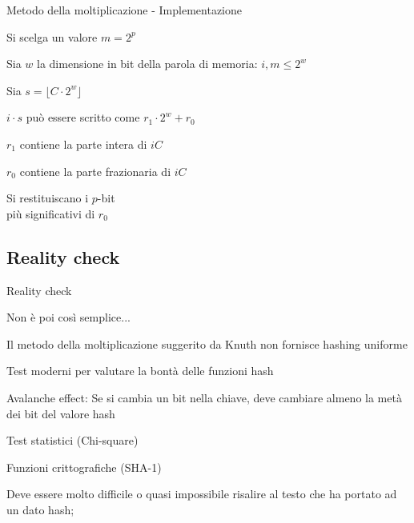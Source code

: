 \begin{frame}{Metodo della moltiplicazione - Implementazione}


\vspace{-9pt}
\BIL
\item Si scelga un valore $m=2^p$
\item Sia $w$ la dimensione in bit della parola di memoria: $i, m \leq 2^w$
\item Sia $s = \lfloor C \cdot 2^w \rfloor$
\item $i \cdot s$ può essere scritto come $r_1 \cdot 2^w + r_0$
	\BI	
	\item $r_1$ contiene la parte intera di $iC$
	\item $r_0$ contiene la parte frazionaria di $iC$
	\EI
\item Si restituiscano i $p$-bit\\ più significativi di $r_0$
\EIL



\end{frame}

\subsection{Reality check}

\begin{frame}{Reality check}

\vspace{-9pt}
\BIL
\item Non è poi così semplice...
\BI
\item Il metodo della moltiplicazione suggerito da Knuth non fornisce hashing uniforme
\EI
\item  Test moderni per valutare la bontà delle funzioni hash
\BI
\item \alert{Avalanche effect}: Se si cambia un bit nella chiave, deve cambiare almeno la metà dei bit del valore hash
\item Test statistici (\alert{Chi-square})
\EI

\item Funzioni crittografiche (SHA-1)
\BI
\item Deve essere molto difficile o quasi impossibile risalire al testo che ha portato ad un dato hash;
\EI
\EIL

\end{frame}

